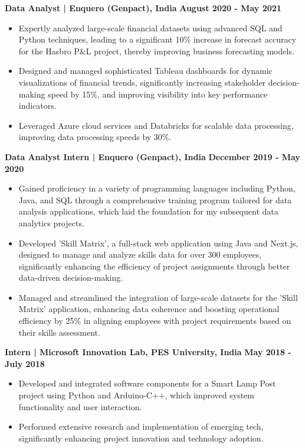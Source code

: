 \documentclass{article}
\begin{document}
\noindent \textbf{Data Analyst | Enquero (Genpact), India} \hfill \textbf{August 2020 - May 2021}
\begin{itemize}[noitemsep,nolistsep,leftmargin=*]
\item {\small Expertly analyzed large-scale financial datasets using advanced SQL and Python techniques, leading to a significant 10\% increase in forecast accuracy for the Hasbro P&L project, thereby improving business forecasting models.}
\item {\small Designed and managed sophisticated Tableau dashboards for dynamic visualizations of financial trends, significantly increasing stakeholder decision-making speed by 15\%, and improving visibility into key performance indicators.}
\item {\small Leveraged Azure cloud services and Databricks for scalable data processing, improving data processing speeds by 30\%.}
\end{itemize}
\vspace{1mm} 
\noindent \textbf{Data Analyst Intern | Enquero (Genpact), India} \hfill \textbf{December 2019 - May 2020}
\begin{itemize}[noitemsep,nolistsep,leftmargin=*]
\item {\small Gained proficiency in a variety of programming languages including Python, Java, and SQL through a comprehensive training program tailored for data analysis applications, which laid the foundation for my subsequent data analytics projects.}
\item {\small Developed 'Skill Matrix', a full-stack web application using Java and Next.js, designed to manage and analyze skills data for over 300 employees, significantly enhancing the efficiency of project assignments through better data-driven decision-making.}
\item {\small Managed and streamlined the integration of large-scale datasets for the 'Skill Matrix' application, enhancing data coherence and boosting operational efficiency by 25\% in aligning employees with project requirements based on their skills assessment.}
\end{itemize}
\vspace{1mm} 
\noindent \textbf{Intern | Microsoft Innovation Lab, PES University, India} \hfill \textbf{May 2018 - July 2018}
\begin{itemize}[noitemsep,nolistsep,leftmargin=*]
\item {\small Developed and integrated software components for a Smart Lamp Post project using Python and Arduino-C++, which improved system functionality and user interaction.}
\item {\small Performed extensive research and implementation of emerging tech, significantly enhancing project innovation and technology adoption.}
\end{itemize}
\end{document}
